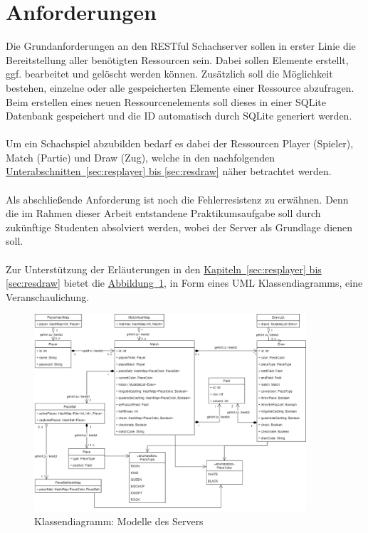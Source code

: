 \section{Anforderungen}\label{sec:anforderungen}
Die Grundanforderungen an den RESTful Schachserver sollen in erster Linie die Bereitstellung aller benötigten Ressourcen sein. Dabei sollen Elemente erstellt, ggf. bearbeitet und gelöscht werden können. Zusätzlich soll die Möglichkeit bestehen, einzelne oder alle gespeicherten Elemente einer Ressource abzufragen. Beim erstellen eines neuen Ressourcenelements soll dieses in einer SQLite Datenbank gespeichert und die ID automatisch durch SQLite generiert werden.\\
\\
Um ein Schachspiel abzubilden bedarf es dabei der Ressourcen Player (Spieler), Match (Partie) und Draw (Zug), welche in den nachfolgenden \hyperref[sec:resplayer, sec:resdraw]{Unterabschnitten~\ref{sec:resplayer} bis \ref{sec:resdraw}} näher betrachtet werden.\\
\\
Als abschließende Anforderung ist noch die Fehlerresistenz zu erwähnen. Denn die im Rahmen dieser Arbeit entstandene Praktikumsaufgabe  soll durch zukünftige Studenten absolviert werden, wobei der Server als Grundlage dienen soll.\\
\\
Zur Unterstützung der Erläuterungen in den \hyperref[sec:resplayer, sec:resdraw]{Kapiteln~\ref{sec:resplayer} bis \ref{sec:resdraw}} bietet die \hyperref[fig:classdiagram]{Abbildung~\ref{fig:classdiagram}}, in Form eines \gls{UML} Klassendiagramms, eine Veranschaulichung.
\begin{figure}
	\includegraphics[width=0.9\textwidth]{images/classdiagram.png}
	\caption{Klassendiagramm: Modelle des Servers}
	\label{fig:classdiagram}
\end{figure}

